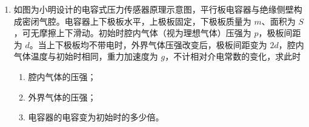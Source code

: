 \documentclass[\gkver]{gaokaozhenti}
\begin{document}
\begin{enumerate}
{$E = Ir = 0.02 \times 142 \times 10^{-3} = 2.84 \times 10^{-3} \UV = 2.84 \UmV$

停止加热时，热电偶受热产生的电动势 $E'$ 最大，如图所示


由图可知，从停止加热到吸合的衔铁被释放，所用的时间约为 $\Delta t = (32.5 - 15) \Us = 17.5 \Us$。
}

\item
如图为小明设计的电容式压力传感器原理示意图，平行板电容器与绝缘侧壁构成密闭气腔。电容器上下极板水平，上极板固定，下极板质量为 $m$、面积为 $S$，可无摩擦上下滑动。初始时腔内气体（视为理想气体）压强为 $p$，极板间距为 $d$。当上下极板均不带电时，外界气体压强改变后，极板间距变为 $2d$，腔内气体温度与初始时相同，重力加速度为 $g$，不计相对介电常数的变化，求此时
\begin{enumerate}
	\item
	腔内气体的压强；
	\item
	外界气体的压强；
	\item
	电容器的电容变为初始时的多少倍。
\end{enumerate}




\end{enumerate}
\end{document}
